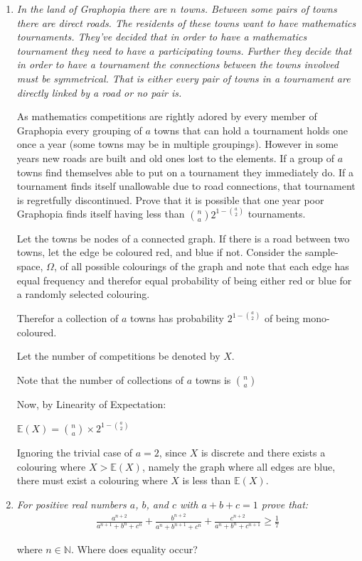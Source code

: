 \documentclass{article}
\begin{document}
\begin{enumerate}
\medskip
\item %
{\itshape In the land of Graphopia there are $n$ towns. Between some pairs of towns there are direct roads. The residents of these towns want to have mathematics tournaments. They've decided that in order to have a mathematics tournament they need to have $a$ participating towns. Further they decide that in order to have a tournament the connections between the towns involved must be symmetrical. That is either every pair of towns in a tournament are directly linked by a road or no pair is. 

As mathematics competitions are rightly adored by every member of Graphopia every grouping of $a$ towns that can hold a tournament holds one once a year (some towns may be in multiple groupings). However in some years new roads are built and old ones lost to the elements. If a group of $a$ towns find themselves able to put on a tournament they immediately do. If a tournament finds itself unallowable due to road connections, that tournament is regretfully discontinued. Prove that it is possible that one year poor Graphopia finds itself having less than $\binom{n}{a} $$2^{1-\binom{a}{2}}$ tournaments.
}


Let the towns be nodes of a connected graph. If there is a road between two towns, let the edge be coloured red, and blue if not.
Consider the sample-space, $\Omega$, of all possible colourings of the graph and note that each edge has equal frequency and therefor equal probability of being either red or blue for a randomly selected colouring.

Therefor a collection of $a$ towns has probability $2^{1-{{a}\choose{2}}}$ of being mono-coloured.

Let the number of competitions be denoted by ${X}$.

Note that the number of collections of $a$ towns is ${n}\choose{a}$

Now, by Linearity of Expectation: 

$\mathbb{E}({X}) = {{n}\choose{a}}\times2^{1-{{a}\choose{2}}}$

Ignoring the trivial case of $a=2$, since $X$ is discrete and there exists a colouring where $X>\mathbb{E}({X})$, namely the graph where all edges are blue, there must exist a colouring where $X$ is less than $\mathbb{E}({X})$.

\medskip
\item %
{\itshape For positive real numbers $a$, $b$, and $c$ with $a+b+c=1$ prove that:
\begin{align*}
 	\frac{a^{n+2}}{a^{n+1} + b^n + c^n} + \frac{b^{n+2}}{a^n + b^{n+1} + c^n} + \frac{c^{n+2}}{a^n + b^n + c^{n+1}} \ge \frac{1}{7}
\end{align*}

where $n \in \mathbb{N}$. Where does equality occur?}


\end{enumerate}
\end{document}
